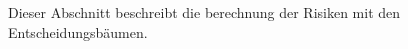 %
%
%
%

\label{subsec:BerechnungRisiken}

Dieser Abschnitt beschreibt die berechnung der Risiken mit den Entscheidungsbäumen.





%

